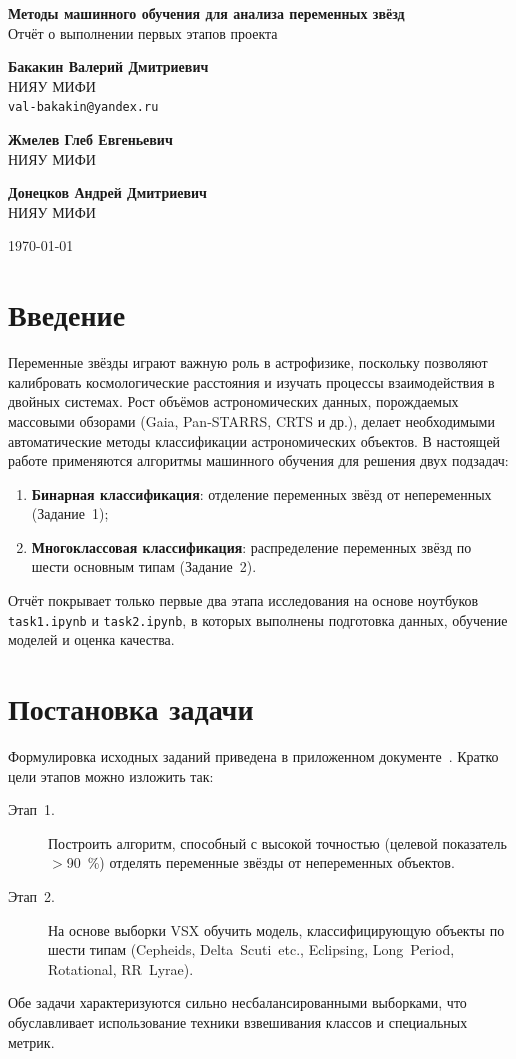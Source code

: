 \documentclass[12pt,a4paper]{article}
\providecommand{\addAuthor}[3]{%
  \par\textbf{#1}\\#2%
  \if\relax\detokenize{#3}\relax\else\\\texttt{#3}\fi%
  \vspace{0.5em}%
}
\begin{document}
\begin{titlepage}
    \centering
    \vspace*{4cm}
    {\LARGE \textbf{Методы машинного обучения для анализа переменных звёзд}\\[0.5cm]}
    {\Large Отчёт о выполнении первых этапов проекта}\\[1cm]

    \addAuthor{Бакакин Валерий Дмитриевич}{НИЯУ МИФИ}{val-bakakin@yandex.ru}

    \addAuthor{Жмелев Глеб Евгеньевич}{НИЯУ МИФИ}{}

    \addAuthor{Донецков Андрей Дмитриевич}{НИЯУ МИФИ}{}

    \vfill
    {\large \today}
\end{titlepage}

\tableofcontents
\newpage

\section{Введение}
Переменные звёзды играют важную роль в астрофизике, поскольку позволяют калибровать космологические расстояния и изучать процессы взаимодействия в двойных системах.
Рост объёмов астрономических данных, порождаемых массовыми обзорами (Gaia, Pan‑STARRS, CRTS и др.), делает необходимыми автоматические методы классификации астрономических объектов.
В настоящей работе применяются алгоритмы машинного обучения для решения двух подзадач:
\begin{enumerate}
    \item \textbf{Бинарная классификация}: отделение переменных звёзд от непеременных (Задание~1);
    \item \textbf{Многоклассовая классификация}: распределение переменных звёзд по шести основным типам (Задание~2).
\end{enumerate}
Отчёт покрывает только первые два этапа исследования на основе ноутбуков \texttt{task1.ipynb} и \texttt{task2.ipynb}, в которых выполнены подготовка данных, обучение моделей и оценка качества.

\section{Постановка задачи}
Формулировка исходных заданий приведена в приложенном документе~\cite{karachurin2025}.
Кратко цели этапов можно изложить так:
\begin{description}
    \item[Этап~1.] Построить алгоритм, способный с высокой точностью (целевой показатель $>$90~\%) отделять переменные звёзды от непеременных объектов.
    \item[Этап~2.] На основе выборки VSX обучить модель, классифицирующую объекты по шести типам (Cepheids, Delta~Scuti~etc., Eclipsing, Long~Period, Rotational, RR~Lyrae).
\end{description}
Обе задачи характеризуются сильно несбалансированными выборками, что обуславливает использование техники взвешивания классов и специальных метрик.
\end{document}

